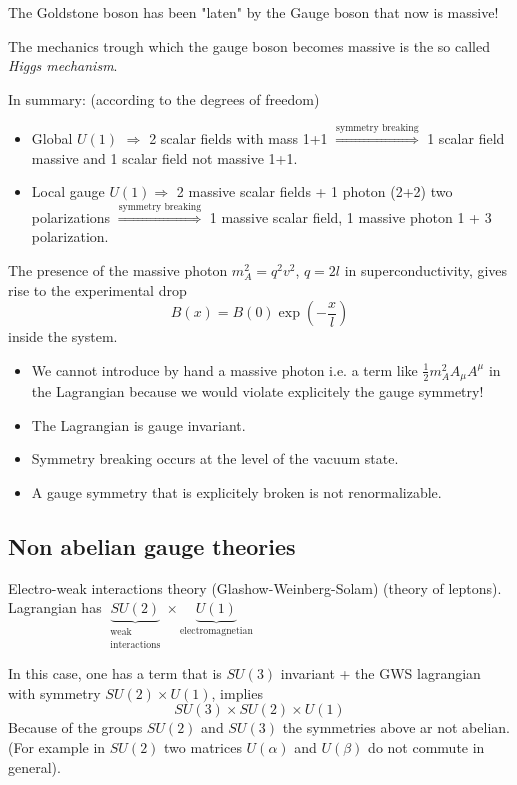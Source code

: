\documentclass[../main/main.tex]{subfiles}
\begin{document}
The Goldstone boson has been "laten" by the Gauge boson that now is massive!

The mechanics trough which the gauge boson becomes massive is the so called \emph{Higgs mechanism}.

In summary: (according to the degrees of freedom)
\begin{itemize}
\item Global \( U(1) \)  \( \Rightarrow  \) 2 scalar fields with mass 1+1 \( \overset{\text{symmetry breaking}}{\Longrightarrow}\)  1 scalar field massive and 1 scalar field not massive 1+1.
\item Local gauge \( U(1) \)\( \Rightarrow  \) 2 massive scalar fields + 1 photon (2+2) two polarizations  \( \overset{\text{symmetry breaking}}{\Longrightarrow}  \) 1 massive scalar field, 1 massive photon 1 + 3 polarization.
\end{itemize}
\begin{remark}
The presence of the massive photon \( m^2_A = q^2 v^2 \), \( q = 2 l \) in superconductivity, gives rise to the experimental drop
\begin{equation}
  B (x) = B(0) \exp (- \frac{x}{l})
\end{equation}
inside the system.
\end{remark}
\begin{itemize}
\item We cannot introduce by hand a massive photon i.e. a term like \( \frac{1}{2} m_A^2 A_ \mu A ^\mu  \) in the Lagrangian because we would violate explicitely the gauge symmetry!

\item The Lagrangian is gauge invariant.
\item Symmetry breaking occurs at the level of the vacuum state.
\item A gauge symmetry that is explicitely broken is not renormalizable.
\end{itemize}
\subsection{Non abelian gauge theories}
\begin{example}
Electro-weak interactions theory (Glashow-Weinberg-Solam) (theory of leptons). Lagrangian has \( \underbrace{S U (2)}_{\substack{ \text{weak} \\  \text{interactions} } }  \times \underbrace{U(1)}_{\text{electromagnetian}}  \)
\end{example}
\begin{example}
\end{example}
In this case, one has a term that is \( SU(3) \) invariant + the GWS lagrangian with symmetry \( SU(2) \times U(1) \), implies
\begin{equation}
  SU(3) \times SU(2) \times U(1)
\end{equation}
Because of the groups \( SU(2) \) and \( SU(3) \) the symmetries above ar not abelian.
(For example in \( SU(2) \) two matrices \( U (\alpha ) \) and \( U(\beta ) \) do not commute in general).
\end{document}
